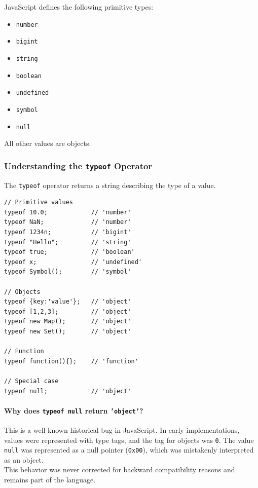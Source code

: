 \documentclass{scrbook}
\begin{document}
JavaScript defines the following primitive types:
\begin{itemize}
    \item \texttt{number}
    \item \texttt{bigint}
    \item \texttt{string}
    \item \texttt{boolean}
    \item \texttt{undefined}
    \item \texttt{symbol}
    \item \texttt{null}
\end{itemize}

All other values are objects.

\subsubsection{Understanding the \texttt{typeof} Operator}

The \texttt{typeof} operator returns a string describing the type of a value.

\begin{lstlisting}
// Primitive values
typeof 10.0;            // 'number'
typeof NaN;             // 'number'
typeof 1234n;           // 'bigint'
typeof "Hello";         // 'string'
typeof true;            // 'boolean'
typeof x;               // 'undefined'
typeof Symbol();        // 'symbol'

// Objects
typeof {key:'value'};   // 'object'
typeof [1,2,3];         // 'object'
typeof new Map();       // 'object'
typeof new Set();       // 'object'

// Function
typeof function(){};    // 'function'

// Special case
typeof null;            // 'object'
\end{lstlisting}

\paragraph{Why does \texttt{typeof null} return \texttt{'object'}?}

This is a well-known historical bug in JavaScript. In early implementations, values were represented with type tags, and the tag for objects was \texttt{0}. The value \texttt{null} was represented as a null pointer (\texttt{0x00}), which was mistakenly interpreted as an object.\\

This behavior was never corrected for backward compatibility reasons and remains part of the language.
\end{document}
